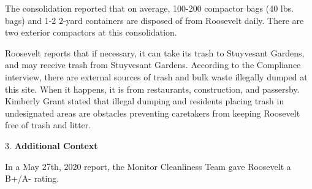 The consolidation reported that on average, 100-200 compactor bags (40 lbs. bags) and 1-2 2-yard containers are disposed of from Roosevelt daily. There are two exterior compactors at this consolidation.

Roosevelt reports that if necessary, it can take its trash to Stuyvesant Gardens, and may receive trash from Stuyvesant Gardens. According to the Compliance interview, there are external sources of trash and bulk waste illegally dumped at this site. When it happens, it is from restaurants, construction, and passersby. Kimberly Grant stated that illegal dumping and residents placing trash in undesignated areas are obstacles preventing caretakers from keeping Roosevelt free of trash and litter.

3. \textbf{Additional Context} 

In a May 27th, 2020 report, the Monitor Cleanliness Team gave Roosevelt a B+/A- rating. 